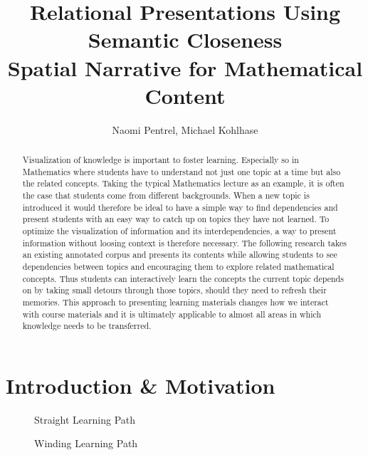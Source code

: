 \documentclass{llncs}
\title{Relational Presentations Using Semantic Closeness\\Spatial Narrative for
  Mathematical Content}
\author{Naomi Pentrel, Michael Kohlhase}
\institute{Jacobs University Bremen}
\begin{document}
\maketitle


\begin{abstract}
Visualization of knowledge is important to foster learning. Especially so in Mathematics where students have to understand not just one topic at a time but also the related concepts. Taking the typical Mathematics lecture as an example, it is often the case that students come from different backgrounds. When a new topic is introduced it would therefore be ideal to have a simple way to find dependencies and present students with an easy way to catch up on topics they have not learned. To optimize the visualization of information and its interdependencies, a way to present information without loosing context is therefore necessary. The following research takes an existing annotated corpus and presents its contents while allowing students to see dependencies between topics and encouraging them to explore related mathematical concepts. Thus students can interactively learn the concepts the current topic depends on by taking small detours through those topics, should they need to refresh their memories. This approach to presenting learning materials changes how we interact with course materials and it is ultimately applicable to almost all areas in which knowledge needs to be transferred.
\end{abstract}

\section{Introduction \& Motivation}
\label{sec:introduction}

\begin{figure}
\vspace{-2em}\centering
      \vspace{-1.8em}
    \caption{Straight Learning Path}\label{fig:straight}
    \vspace{5pt}  
      \vspace{-1.8em}
      \caption{Winding Learning Path}\label{fig:curvy}
      \vspace{-2em}
\end{figure}
\end{document}
